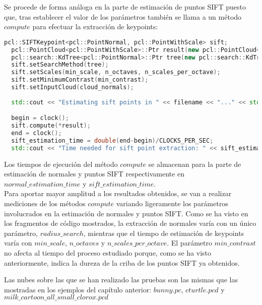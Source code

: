 Se procede de forma análoga en la parte de estimación de puntos SIFT puesto que, tras establecer el valor de los parámetros también se llama a un método $compute$ para efectuar la extracción de keypoints:

\begin{lstlisting}[language=C++,breaklines]
  pcl::SIFTKeypoint<pcl::PointNormal, pcl::PointWithScale> sift;
  pcl::PointCloud<pcl::PointWithScale>::Ptr result(new pcl::PointCloud<pcl::PointWithScale>);
  pcl::search::KdTree<pcl::PointNormal>::Ptr tree(new pcl::search::KdTree<pcl::PointNormal> ());
  sift.setSearchMethod(tree);
  sift.setScales(min_scale, n_octaves, n_scales_per_octave);
  sift.setMinimumContrast(min_contrast);
  sift.setInputCloud(cloud_normals);
 
  std::cout << "Estimating sift points in " << filename << "..." << std::endl;

  begin = clock();
  sift.compute(*result);
  end = clock();
  sift_estimation_time = double(end-begin)/CLOCKS_PER_SEC;
  std::cout << "Time needed for sift point extraction: " << sift_estimation_time << " seconds" << std::endl << std::endl;
\end{lstlisting}

Los tiempos de ejecución del método $compute$ se almacenan para la parte de estimación de normales y puntos SIFT respectivamente en $normal\_estimation\_time$ y $sift\_estimation\_time$.
\\
Para aportar mayor amplitud a los resultados obtenidos, se van a realizar mediciones de los métodos $compute$ variando ligeramente los parámetros involucrados en la estimación de normales y puntos SIFT. Como se ha visto en los fragmentos de código mostrados, la extracción de normales varía con un único parámetro, $radius\_search$, mientras que el tiempo de estimación de keypoints varía con $min\_scale$, $n\_octaves$ y $n\_scales\_per\_octave$. El parámetro $min\_contrast$ no afecta al tiempo del proceso estudiado porque, como se ha visto anteriormente, indica la dureza de la criba de los puntos SIFT ya obtenidos.

Las nubes sobre las que se han realizado las pruebas son las mismas que las mostradas en los ejemplos del capítulo anterior: $bunny.pc$, $cturtle.pcd$ y $milk\_cartoon\_all\_small\_clorox.pcd$

